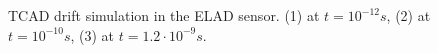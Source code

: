 \begin{figure}[H]
\begin{minipage}[h]{0.24\linewidth}
\end{minipage}
\begin{minipage}[h]{0.24\linewidth}
\end{minipage}
\caption[short description here]
  {TCAD drift simulation in the ELAD sensor. (1) at $t = 10^{-12} s$, (2) at $t = 10^{-10} s$, (3) at $t = 1.2 \cdot 10^{-9} s$. 
 }
\label{fig:drift}
\end{figure}


